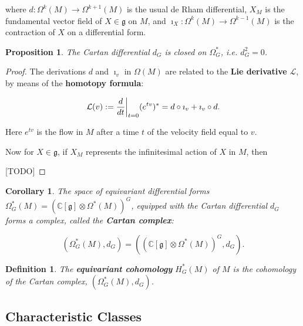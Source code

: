 \documentclass{article}
\newtheorem{prop}[theorem]{Proposition}
\newtheorem{corollary}[theorem]{Corollary}
\newtheorem{defn}[theorem]{Definition\rm}
\newcommand{\ie}{\emph{i.e.} }
\newcommand{\ra}{\rightarrow}
\newcommand{\W}{\Omega}
\newcommand{\CC}{\mathbb{C}}
\newcommand{\mcL}{\mathcal{L}}
\newcommand{\mfg}{\mathfrak{g}}
\newcommand{\mc}[1]{\mathcal{#1}}
\newcommand\restr[2]{{%
		\left.\kern-\nulldelimiterspace %
		#1 %
		\vphantom{\big|} %
		\right|_{#2} %
}}
\begin{document}
where $d :\W^{k}(M) \ra \W^{k+1}(M)$ is the usual de Rham differential, $X_{M}$ is the fundamental vector field of $X \in \mfg$ on $M$, and $\imath_{X} : \W^{k}(M) \ra \W^{k-1}(M)$ is the contraction of $X$ on a differential form.

\begin{prop}
	The Cartan differential $d_{G}$ is closed on $\W_{G}^{\ast}$, \ie $d_{G}^{2} = 0$.
\end{prop}

\begin{proof}
	
	The derivations $d$ and $\imath_{v}$ in $\W(M)$ are related to the \textbf{Lie derivative} $\mcL$, by means of the \textbf{homotopy formula}:
	
	\begin{equation*}
		\mc{L}(v) := \restr{\frac{d}{dt}}{t = 0} (e^{tv})^{\ast} = d \circ \imath_{v} + \imath_{v} \circ d.
	\end{equation*}
	
	Here $e^{tv}$ is the flow in $M$ after a time $t$ of the velocity field equal to $v$.
	
	Now for $X \in \mfg$, if $X_{M}$ represents the infinitesimal action of $X$ in $M$, then 
	
	[TODO]
	
\end{proof}

\begin{corollary}
	The space of equivariant differential forms $\W_{G}^{\ast}(M) = \left( \CC[\mfg] \otimes \W^{\ast}(M) \right)^{G}$, equipped with the Cartan differential $d_{G}$ forms a complex, called the \textbf{Cartan complex}:
	
	\begin{equation*}
		\left( \W_{G}^{\ast}(M), d_{G} \right) = \left( (\CC[\mfg] \otimes \W^{\ast}(M)   )^{G}, d_{G} \right).
	\end{equation*}

\end{corollary}

\begin{defn}
	The \textbf{equivariant cohomology} $H_{G}^{\ast}(M)$ of $M$ is the cohomology of the Cartan complex, $(\W_{G}^{\ast}(M), d_{G})$.
\end{defn}

\subsection{Characteristic Classes}
\end{document}
